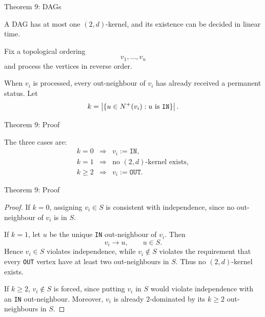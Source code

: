 \documentclass[11pt]{beamer}
\begin{document}
\begin{frame}{Theorem 9: DAGs}

  \begin{theorem}
    A DAG has at most one $(2,d)$-kernel, and its existence can be
    decided in linear time.
  \end{theorem}

  \bigskip

  Fix a topological ordering
  \[
    v_1,\ldots,v_n
  \]
  and process the vertices in reverse order.

  \smallskip

  When $v_i$ is processed, every out-neighbour of $v_i$ has already
  received a permanent status. Let
  \[
    k=\left|\{u\in N^+(v_i):u\text{ is \texttt{IN}}\}\right|.
  \]

\end{frame}
\begin{frame}{Theorem 9: Proof}

  The three cases are:
  \[
    \begin{array}{ccl}
      k=0   & \Rightarrow & v_i:=\texttt{IN},                \\
      k=1   & \Rightarrow & \text{no $(2,d)$-kernel exists}, \\
      k\ge2 & \Rightarrow & v_i:=\texttt{OUT}.
    \end{array}
  \]
\end{frame}

\begin{frame}{Theorem 9: Proof}

  \begin{proof}
    If $k=0$, assigning $v_i\in S$ is consistent with independence,
    since no out-neighbour of $v_i$ is in $S$.

    \smallskip

    If $k=1$, let $u$ be the unique \texttt{IN} out-neighbour of $v_i$.
    Then
    \[
      v_i\to u,\qquad u\in S.
    \]
    Hence $v_i\in S$ violates independence, while $v_i\notin S$
    violates the requirement that every \texttt{OUT} vertex have at
    least two out-neighbours in $S$. Thus no $(2,d)$-kernel exists.

    \smallskip

    If $k\ge2$, $v_i\notin S$ is forced, since putting $v_i$ in $S$
    would violate independence with an \texttt{IN} out-neighbour.
    Moreover, $v_i$ is already 2-dominated by its $k\ge2$ out-neighbours
    in $S$.
  \end{proof}
\end{frame}
\end{document}
